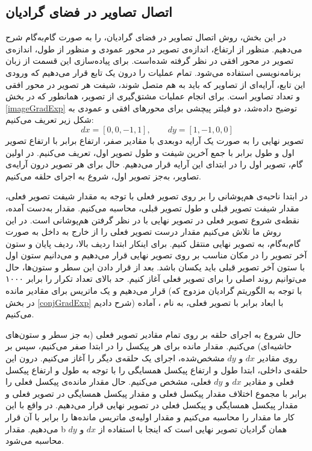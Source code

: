 \subsection{اتصال تصاویر در فضای گرادیان}
در این بخش، روش اتصال تصاویر در فضای گرادیان، را به صورت گام‌به‌گام شرح می‌دهیم. منظور از ارتفاع، اندازه‌ی تصویر در محور عمودی و منظور از طول، اندازه‌ی تصویر در محور افقی در نظر گرفته شده‌است. برای پیاده‌سازی این قسمت از زبان برنامه‌نویسی  استفاده می‌شود. تمام عملیات را درون یک تابع قرار می‌دهیم که ورودی این تابع، آرایه‌ای از تصاویر که باید به هم متصل شوند، شیفت هر تصویر در محور افقی و تعداد تصاویر است. برای انجام عملیات مشتق‌گیری از تصویر، همانطور که در بخش \ref{imageGradExp} توضیح داده‌شد، دو فیلتر پیچشی برای محور‌های افقی و عمودی به شکل زیر تعریف می‌کنیم:
\begin{equation}
	dx = [0, 0, -1, 1], \qquad dy = [1, -1, 0, 0]
\end{equation}
تصویر نهایی را به صورت یک آرایه دوبعدی با مقادیر صفر، ارتفاع برابر با ارتفاع تصویر اول و طول برابر با جمع آخرین شیفت و طول تصویر اول، تعریف می‌کنیم. در اولین گام، تصویر اول را در ابتدای این آرایه قرار می‌دهیم. حال برای هر تصویر درون آرایه‌ی تصاویر، به‌جز تصویر اول، شروع به اجرای حلقه می‌کنیم.

در ابتدا ناحیه‌ی هم‌پوشانی را بر روی تصویر فعلی با توجه به مقدار شیفت تصویر فعلی، مقدار شیفت تصویر قبلی و طول تصویر قبلی، محاسبه می‌کنیم. مقدار به‌دست آمده، نقطه‌ی شروع تصویر فعلی در تصویر نهایی با در نظر گرفتن هم‌پوشانی است. در این روش ما تلاش می‌کنیم مقدار درست تصویر فعلی را از خارج به داخل به صورت گام‌به‌گام، به تصویر نهایی منتقل کنیم. برای اینکار ابتدا ردیف بالا، ردیف پایان و ستون آخر تصویر را در مکان مناسب بر روی تصویر نهایی قرار می‌دهیم و می‌دانیم ستون اول با ستون آخر تصویر قبلی باید یکسان باشد. بعد از قرار دادن این سطر و ستون‌ها، حال می‌توانیم روند اصلی را برای تصویر فعلی آغاز کنیم. حد بالای تعداد تکرار را برابر ۱۰۰۰ قرار می‌دهیم و یک ماتریس برای مقادیر مانده (با توجه به الگوریتم گرادیان مزدوج که در بخش \ref{conjGradExp} شرح دادیم) با ابعاد برابر با تصویر فعلی، به نام ، آماده می‌کنیم.

حال شروع به اجرای حلقه بر روی تمام مقادیر تصویر فعلی (به جز سطر و ستون‌های حاشیه‌ای) می‌کنیم. مقدار مانده برای هر پیکسل را در ابتدا صفر می‌کنیم، سپس بر روی مقادیر $dx$ و $dy$ مشخص‌شده، اجرای یک حلقه‌ی‌ دیگر را آغاز می‌کنیم. درون این حلقه‌ی داخلی، ابتدا طول و ارتفاع پیکسل همسایگی را با توجه به طول و ارتفاع پیکسل فعلی و مقادیر $dx$ و $dy$ فعلی، مشخص می‌کنیم. حال مقدار مانده‌ی پیکسل فعلی را برابر با مجموع اختلاف مقدار پیکسل فعلی و مقدار پیکسل همسایگی در تصویر فعلی و مقدار پیکسل همسایگی و پیکسل فعلی در تصویر نهایی قرار می‌دهیم. در واقع با این کار ما مقدار  را محاسبه می‌کنیم و مقدار اولیه‌ی ماتریس مانده‌ها را برابر با آن قرار می‌دهیم. مقدار b همان گرادیان تصویر نهایی است که اینجا با استفاده از $dx$ و $dy$ محاسبه می‌شود.

